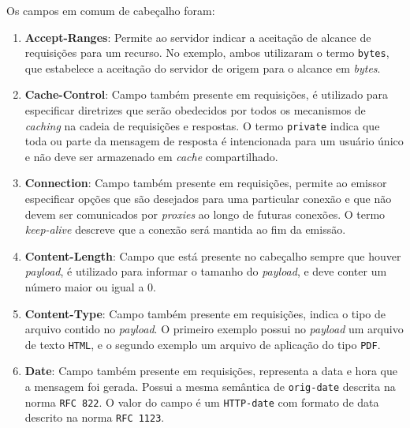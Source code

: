 Os campos em comum de cabeçalho foram:

\begin{enumerate}
	\item{\textbf{Accept-Ranges}: Permite ao servidor indicar a aceitação de alcance de requisições para um recurso. No exemplo, ambos utilizaram o termo \texttt{bytes}, que estabelece a aceitação do servidor de origem para o alcance em \emph{bytes}.}
	\item{\textbf{Cache-Control}: Campo também presente em requisições, é utilizado para especificar diretrizes que serão obedecidos por todos os mecanismos de \emph{caching} na cadeia de requisições e respostas. O termo \texttt{private} indica que toda ou parte da mensagem de resposta é intencionada para um usuário único e não deve ser armazenado em \emph{cache} compartilhado.}
	\item{\textbf{Connection}: Campo também presente em requisições, permite ao emissor especificar opções que são desejados para uma particular conexão e que não devem ser comunicados por \emph{proxies} ao longo de futuras conexões. O termo \emph{keep-alive} descreve que a conexão será mantida ao fim da emissão.}
	\item{\textbf{Content-Length}: Campo que está presente no cabeçalho sempre que houver \emph{payload}, é utilizado para informar o tamanho do \emph{payload}, e deve conter um número maior ou igual a $0$.}
	\item{\textbf{Content-Type}: Campo também presente em requisições, indica o tipo de arquivo contido no \emph{payload}. O primeiro exemplo possui no \emph{payload} um arquivo de texto \texttt{HTML}, e o segundo exemplo um arquivo de aplicação do tipo \texttt{PDF}.}
	\item{\textbf{Date}: Campo também presente em requisições, representa a data e hora que a mensagem foi gerada. Possui a mesma semântica de \texttt{orig-date} descrita na norma \texttt{RFC 822}. O valor do campo é um \texttt{HTTP-date} com formato de data descrito na norma \texttt{RFC 1123}.}
\end{enumerate}
